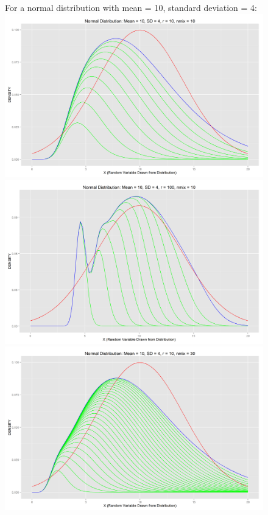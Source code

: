 \documentclass[letter]{article}
\begin{document}
\begin{figure}[H]
\centering
\newpage
\Large{For a normal distribution with mean = 10, standard deviation = 4:}\\
\includegraphics[scale=.27]{figures/normdist_10_4_10_10.png}
\includegraphics[scale=.27]{figures/normdist_10_4_100_10.png}\\
\includegraphics[scale=.27]{figures/normdist_10_4_10_30.png}

\end{figure}
\end{document}
